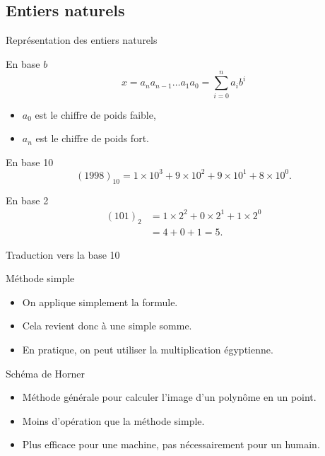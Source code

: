 \subsection{Entiers naturels}

\begin{frame}{Représentation des entiers naturels}                                                                                                                
 \begin{block}{En base $b$}
 \[
  x = a_n a_{n-1} \ldots a_1 a_0  = \sum_{i=0}^n a_i b^i
  \]
  \begin{itemize}
  \item $a_0$ est le chiffre de poids faible,
  \item $a_n$ est le chiffre de poids fort.
  \end{itemize}
\end{block}
\begin{exampleblock}{En base 10}
    \[
      (1998)_{10} = 1 \times 10^3 + 9 \times 10^2 + 9 \times 10^1 + 8 \times 10^0 .
    \]
\end{exampleblock}

\begin{exampleblock}{En base 2}
  \begin{align*}
    (101)_2 & = 1 \times 2^2 + 0 \times 2^1 + 1 \times 2^0 \\
            &= 4 + 0 + 1 = 5.
  \end{align*}
          
\end{exampleblock}
\end{frame}

\begin{frame}{Traduction vers la base 10}
  \begin{block}{Méthode simple}
    \begin{itemize}
    \item On applique simplement la formule.
    \item Cela revient donc à une simple somme.
    \item En pratique, on peut utiliser la multiplication égyptienne.
    \end{itemize}
  \end{block}

  \begin{block}{Schéma de Horner}
    \begin{itemize}
    \item Méthode générale pour calculer l'image d'un polynôme en un point.
    \item Moins d'opération que la méthode simple.
    \item Plus efficace pour une machine, pas nécessairement pour un humain.
    \end{itemize}

  \end{block}
\end{frame}



